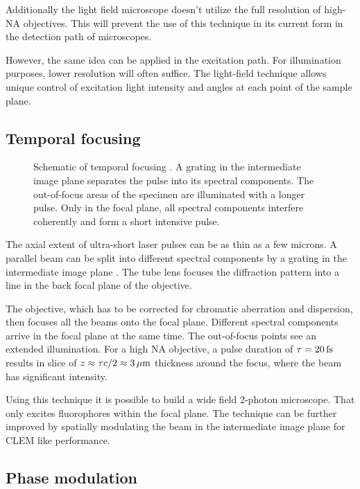 Additionally the light field microscope doesn't utilize the full
resolution of high-NA objectives. This will prevent the use of this
technique in its current form in the detection path of microscopes.

However, the same idea can be applied in the excitation path. For
illumination purposes, lower resolution will often suffice. The
light-field technique allows unique control of excitation light
intensity and angles at each point of the sample plane.

\subsection{Temporal focusing}
\begin{figure}[!hbt]
  \centering
  
  \caption{Schematic of temporal focusing \citep[inspired
    from][]{Oron2005}. A grating in the intermediate image plane
    separates the pulse into its spectral components. The out-of-focus
    areas of the specimen are illuminated with a longer pulse. Only in
    the focal plane, all spectral components interfere coherently and
    form a short intensive pulse.}
  \label{fig:oron}
\end{figure}
The axial extent of ultra-short laser pulses can be as thin as a few
microns. A parallel beam can be split into different spectral
components by a grating in the intermediate image plane
\citep{Oron2005}. The tube lens focuses the diffraction pattern into a
line in the back focal plane of the objective.

The objective, which has to be corrected for chromatic aberration and
dispersion, then focuses all the beams onto the focal plane. Different
spectral components arrive in the focal plane at the same time. The
out-of-focus points see an extended illumination. For a high NA
objective, a pulse duration of $\tau=\unit[20]{fs}$ results in slice
of $z\approx\tau c/2\approx\unit[3]{\mu m}$ thickness around the
focus, where the beam has significant intensity.

Using this technique it is possible to build a wide field 2-photon
microscope. That only excites fluorophores within the focal plane. The
technique can be further improved by spatially modulating the beam
in the intermediate image plane for CLEM like performance.

\subsection{Phase modulation}
